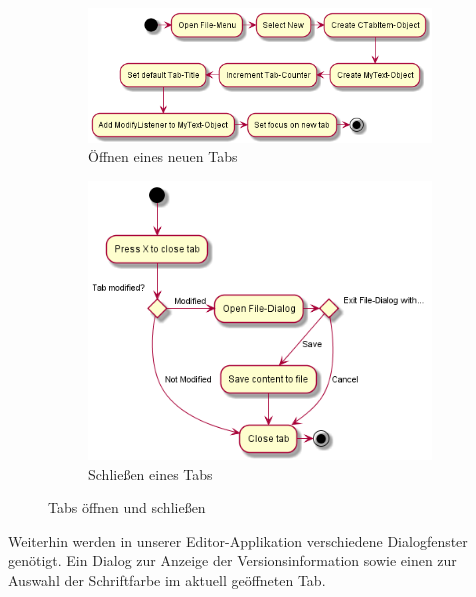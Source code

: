 \begin{figure}[H]
    \centering
    \begin{subfigure}[b]{0.45\linewidth}
        \centering
        \includegraphics[width=\linewidth]{figures/newtab/newtab.png}
        \caption{Öffnen eines neuen Tabs}
    \end{subfigure}
    \begin{subfigure}[b]{0.45\linewidth}
        \centering
        \includegraphics[width=\linewidth]{figures/closetab/closetab.png}
        \caption{Schließen eines Tabs}
    \end{subfigure}
    \caption{Tabs öffnen und schließen}
    \label{fig:tabs}
\end{figure}

\noindent
Weiterhin werden in unserer Editor-Applikation verschiedene Dialogfenster genötigt.
Ein Dialog zur Anzeige der Versionsinformation sowie einen zur Auswahl der Schriftfarbe im aktuell geöffneten Tab.

